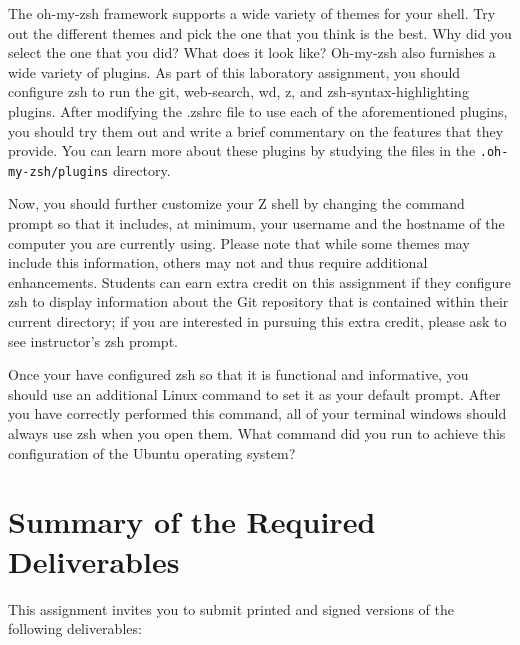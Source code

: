 The oh-my-zsh framework supports a wide variety of themes for your shell.  Try out the different themes and pick the one that you
think is the best.  Why did you select the one that you did? What does it look like? Oh-my-zsh also furnishes a wide variety of
plugins.  As part of this laboratory assignment, you should configure zsh to run the git, web-search, wd, z, and
zsh-syntax-highlighting plugins.  After modifying the .zshrc file to use each of the aforementioned plugins, you should try them
out and write a brief commentary on the features that they provide. You can learn more about these plugins by studying the files in
the {\tt .oh-my-zsh/plugins} directory.

Now, you should further customize your Z shell by changing the command prompt so that it includes, at minimum, your username and
the hostname of the computer you are currently using.  Please note that while some themes may include this information, others may
not and thus require additional enhancements.  Students can earn extra credit on this assignment if they configure zsh to display
information about the Git repository that is contained within their current directory; if you are interested in pursuing this
extra credit, please ask to see instructor's zsh prompt.

Once your have configured zsh so that it is functional and informative, you should use an additional Linux command to set it as
your default prompt.  After you have correctly performed this command, all of your terminal windows should always use zsh when you
open them.  What command did you run to achieve this configuration of the Ubuntu operating system?

\section*{Summary of the Required Deliverables}

This assignment invites you to submit printed and signed versions of the following deliverables: 

